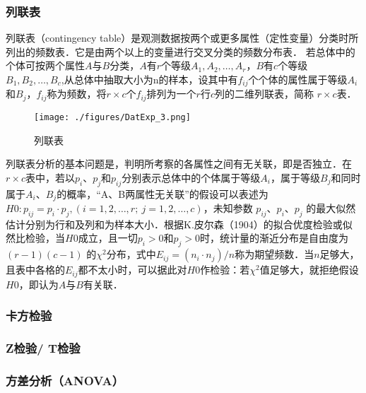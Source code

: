 \subsubsection{列联表}
列联表（contingency table）是观测数据按两个或更多属性（定性变量）分类时所列出的频数表．它是由两个以上的变量进行交叉分类的频数分布表．
若总体中的个体可按两个属性$A$与$B$分类，$A$有$r$个等级$A_1,A_2,\dots,A_r$，$B$有$c$个等级$B_1,B_2,\dots, B_c$,从总体中抽取大小为n的样本，设其中有$f_{ij}$个个体的属性属于等级$A_i$和$B_j$，$f_{ij}$称为频数，将$r\times c$个$f_{ij}$排列为一个$r$行$c$列的二维列联表，简称 $r\times c$表．
\begin{figure}[ht]
\centering
\texttt{[image: ./figures/DatExp\_3.png]}
\caption{列联表} \label{DatExp_fig3}
\end{figure}
列联表分析的基本问题是，判明所考察的各属性之间有无关联，即是否独立．在$r\times c$表中，若以$p_i$、$p_j$和$p_{ij}$分别表示总体中的个体属于等级$A_i$，属于等级$B_j$和同时属于$A_i$、$B_j$的概率，“A、B两属性无关联”的假设可以表述为$H0: p_{ij}=p_i\cdot p_j, (i=1,2,\dots, r; \ j=1,2,\dots,c)$，未知参数 $p_{ij}$、$p_i$、$p_j$ 的最大似然估计分别为行和及列和为样本大小．根据K.皮尔森（1904）的拟合优度检验或似然比检验，当$H0$成立，且一切$p_i>0$和$p_j>0$时，统计量的渐近分布是自由度为$(r-1)(c-1)$ 的$\chi^2$分布，式中$E_{ij}=(n_i \cdot n_j)/n$称为期望频数．当$n$足够大，且表中各格的$E_{ij}$都不太小时，可以据此对$H0$作检验：若$\chi^2$值足够大，就拒绝假设$H0$，即认为$A$与$B$有关联．
\subsubsection{卡方检验}
\subsubsection{Z检验/ T检验}
\subsubsection{方差分析（ANOVA）}
